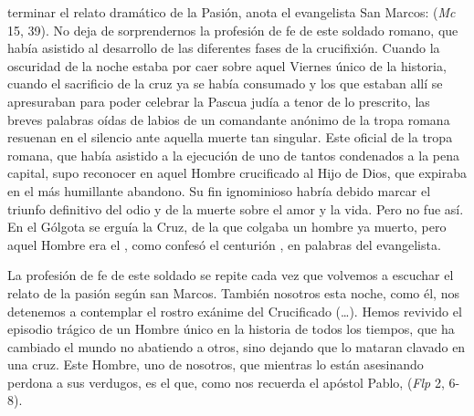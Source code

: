 \begin{body}
 terminar el relato dramático de la Pasión, anota el evangelista San Marcos:  (\textit{Mc} 15, 39). No deja de sorprendernos la profesión de fe de este soldado romano, que había asistido al desarrollo de las diferentes fases de la crucifixión. Cuando la oscuridad de la noche estaba por caer sobre aquel Viernes único de la historia, cuando el sacrificio de la cruz ya se había consumado y los que estaban allí se apresuraban para poder celebrar la Pascua judía a tenor de lo prescrito, las breves palabras oídas de labios de un comandante anónimo de la tropa romana resuenan en el silencio ante aquella muerte tan singular. Este oficial de la tropa romana, que había asistido a la ejecución de uno de tantos condenados a la pena capital, supo reconocer en aquel Hombre crucificado al Hijo de Dios, que expiraba en el más humillante abandono. Su fin ignominioso habría debido marcar el triunfo definitivo del odio y de la muerte sobre el amor y la vida. Pero no fue así. En el Gólgota se erguía la Cruz, de la que colgaba un hombre ya muerto, pero aquel Hombre era el , como confesó el centurión , en palabras del evangelista.

La profesión de fe de este soldado se repite cada vez que volvemos a escuchar el relato de la pasión según san Marcos. También nosotros esta noche, como él, nos detenemos a contemplar el rostro exánime del Crucificado (\ldots). Hemos revivido el episodio trágico de un Hombre único en la historia de todos los tiempos, que ha cambiado el mundo no abatiendo a otros, sino dejando que lo mataran clavado en una cruz. Este Hombre, uno de nosotros, que mientras lo están asesinando perdona a sus verdugos, es el  que, como nos recuerda el apóstol Pablo,  (\textit{Flp} 2, 6-8).


\end{body}
